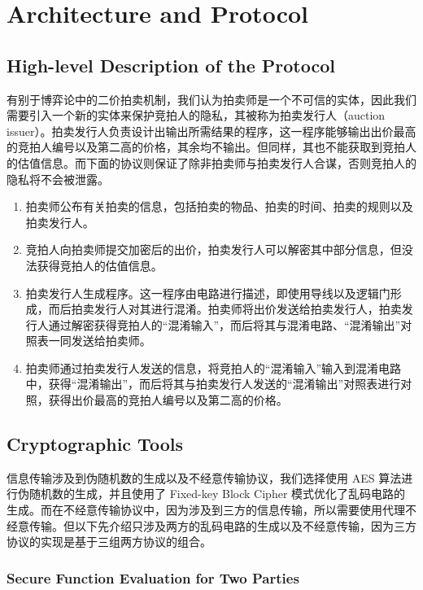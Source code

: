 \section{Architecture and Protocol}
\subsection{High-level Description of the Protocol}
有别于博弈论中的二价拍卖机制，我们认为拍卖师是一个不可信的实体，因此我们需要引入一个新的实体来保护竞拍人的隐私，其被称为拍卖发行人（auction issuer）。拍卖发行人负责设计出输出所需结果的程序，这一程序能够输出出价最高的竞拍人编号以及第二高的价格，其余均不输出。但同样，其也不能获取到竞拍人的估值信息。而下面的协议则保证了除非拍卖师与拍卖发行人合谋，否则竞拍人的隐私将不会被泄露。

\begin{enumerate}
    \item 拍卖师公布有关拍卖的信息，包括拍卖的物品、拍卖的时间、拍卖的规则以及拍卖发行人。
    \item 竞拍人向拍卖师提交加密后的出价，拍卖发行人可以解密其中部分信息，但没法获得竞拍人的估值信息。
    \item 拍卖发行人生成程序。这一程序由电路进行描述，即使用导线以及逻辑门形成，而后拍卖发行人对其进行混淆。拍卖师将出价发送给拍卖发行人，拍卖发行人通过解密获得竞拍人的“混淆输入”，而后将其与混淆电路、“混淆输出”对照表一同发送给拍卖师。
    \item 拍卖师通过拍卖发行人发送的信息，将竞拍人的“混淆输入”输入到混淆电路中，获得“混淆输出”，而后将其与拍卖发行人发送的“混淆输出”对照表进行对照，获得出价最高的竞拍人编号以及第二高的价格。
\end{enumerate}

\subsection {Cryptographic Tools}

信息传输涉及到伪随机数的生成以及不经意传输协议，我们选择使用 AES 算法进行伪随机数的生成，并且使用了 Fixed-key Block Cipher 模式优化了乱码电路的生成。而在不经意传输协议中，因为涉及到三方的信息传输，所以需要使用代理不经意传输。但以下先介绍只涉及两方的乱码电路的生成以及不经意传输，因为三方协议的实现是基于三组两方协议的组合。

\subsubsection{Secure Function Evaluation for Two Parties}

